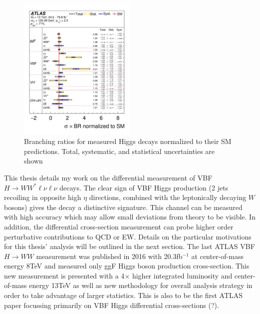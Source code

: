 \begin{figure}[H]
        \centering
    \includegraphics[width=0.5\textwidth] {Pictures/branchingratio.png}\hspace{1cm}
    \caption{Branching ratios for measured Higgs decays normalized to their SM predictions. Total, systematic, and statistical uncertainties are shown \cite{HiggsCurrent}}
    \label{fig:branchingratio}
\end{figure}
This thesis details my work on the differential measurement of VBF $H\rightarrow WW^*\ell\nu\ell\nu$ decays. The clear sign of VBF Higgs production (2 jets recoiling in opposite high $\eta$ directions, combined with the leptonically decaying $W$ bosons) gives the decay a distinctive signature. This channel can be measured with high accuracy which may allow small deviations from theory to be visible. In addition, the differential cross-section measurement can probe higher order perturbative contributions to QCD or EW. Details on the particular motivations for this thesis' analysis will be outlined in the next section. The last ATLAS VBF $H\rightarrow WW$ measurement was published in 2016 with 20.3fb$^{-1}$ at center-of-mass energy 8TeV and measured only ggF Higgs boson production cross-section\cite{HiggsDifferential}. This new measurement is presented with a 4$\times$ higher integrated luminosity and center-of-mass energy 13TeV as well as new methodology for overall analysis strategy in order to take advantage of larger statistics. This is also to be the first ATLAS paper focussing primarily on VBF Higgs differential cross-sections (?). 

